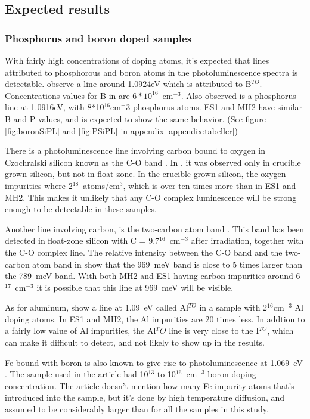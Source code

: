 \subsection{Expected results}

\subsubsection{Phosphorus and boron doped samples}

With fairly high concentrations of doping atoms, it's expected that lines attributed to phosphorous and boron atoms in the photoluminescence spectra is detectable. \cite{dean67} observe a line around 1.0924eV which is attributed to B$^{TO}$. Concentrations values for B in \cite{dean67} are $6*10^{16}$~cm$^{-3}$. Also observed is a phosphorus line at 1.0916eV, with 8*10$^{16}$cm$^-3$ phosphorus atoms. ES1 and MH2 have similar B and P values, and is expected to show the same behavior. (See figure \ref{fig:boronSiPL} and \ref{fig:PSiPL} in appendix \ref{appendix:tabeller})

There is a photoluminescence line involving carbon bound to oxygen in Czochralski silicon known as the C-O band \cite{davies88}. In \cite{hare72}, it was observed only in crucible grown silicon, but not in float zone. In the crucible grown silicon, the oxygen impurities where 2$^{18}$~atoms/cm$^3$, which is over ten times more than in ES1 and MH2. This makes it unlikely that any C-O complex luminescence will be strong enough to be detectable in these samples.

Another line involving carbon, is the two-carbon atom band \cite{davies88}. This band has been detected in float-zone silicon with C = 9.7$^{16}$~cm$^{-3}$ after irradiation, together with the C-O complex line. The relative intensity between the C-O band and the two-carbon atom band in \cite{davies88} show that the 969~meV band is close to 5 times larger than the 789~meV band. With both MH2 and ES1 having carbon impurities around 6$^{17}$~cm$^{-3}$ it is possible that this line at 969~meV will be visible. 

As for aluminum, \cite{dean67} show a line at 1.09~eV called Al$^{TO}$ in a sample with 2$^{16}$cm$^{-3}$ Al doping atoms. In ES1 and MH2, the Al impurities are 20 times less. In addtion to a fairly low value of Al impurities, the Al$^TO$ line is very close to the I$^{TO}$, which can make it difficult to detect, and not likely to show up in the results.

Fe bound with boron is also known to give rise to photoluminescence at 1.069~eV \cite{mohring83}. The sample used in the article had  10$^{13}$ to 10$^{16}$~cm$^{-3}$ boron doping concentration. The article doesn't mention how many Fe impurity atoms that's introduced into the sample, but it's done by high temperature diffusion, and assumed to be considerably larger than for all the samples in this study. 

